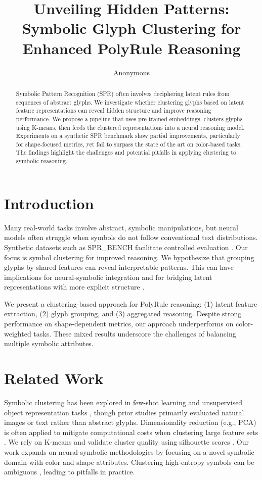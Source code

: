 \documentclass{article} %
\title{Unveiling Hidden Patterns: Symbolic Glyph Clustering for Enhanced PolyRule Reasoning}
\author{Anonymous}
\theoremstyle{plain}
\theoremstyle{definition}
\theoremstyle{remark}
\begin{document}
\maketitle

\begin{abstract}
Symbolic Pattern Recognition (SPR) often involves deciphering latent rules from sequences of abstract glyphs. We investigate whether clustering glyphs based on latent feature representations can reveal hidden structure and improve reasoning performance. We propose a pipeline that uses pre-trained embeddings, clusters glyphs using K-means, then feeds the clustered representations into a neural reasoning model. Experiments on a synthetic SPR benchmark show partial improvements, particularly for shape-focused metrics, yet fail to surpass the state of the art on color-based tasks. The findings highlight the challenges and potential pitfalls in applying clustering to symbolic reasoning.
\end{abstract}

\section{Introduction}
\label{sec:intro}
Many real-world tasks involve abstract, symbolic manipulations, but neural models often struggle when symbols do not follow conventional text distributions. Synthetic datasets such as SPR\_BENCH facilitate controlled evaluation \citep{morishita2024enhancingrc}. Our focus is symbol clustering for improved reasoning. We hypothesize that grouping glyphs by shared features can reveal interpretable patterns. This can have implications for neural-symbolic integration \citep{barbiero2023interpretablenc, jeong2025symbolnetbl} and for bridging latent representations with more explicit structure \citep{goodfellow2016deep}.

We present a clustering-based approach for PolyRule reasoning: (1) latent feature extraction, (2) glyph grouping, and (3) aggregated reasoning. Despite strong performance on shape-dependent metrics, our approach underperforms on color-weighted tasks. These mixed results underscore the challenges of balancing multiple symbolic attributes.

\section{Related Work}
\label{sec:related}
Symbolic clustering has been explored in few-shot learning \citep{snell2017prototypicalnf} and unsupervised object representation tasks \citep{weis2020benchmarkinguo}, though prior studies primarily evaluated natural images or text rather than abstract glyphs. Dimensionality reduction (e.g., PCA) is often applied to mitigate computational costs when clustering large feature sets \citep{rajotia2025principalca}. We rely on K-means \citep{hamerly2017acceleratingla} and validate cluster quality using silhouette scores \citep{shahapure2020clusterqa}. Our work expands on neural-symbolic methodologies \citep{barbiero2023interpretablenc, jeong2025symbolnetbl} by focusing on a novel symbolic domain with color and shape attributes. Clustering high-entropy symbols can be ambiguous \citep{bereta2025theso}, leading to pitfalls in practice.
\end{document}
